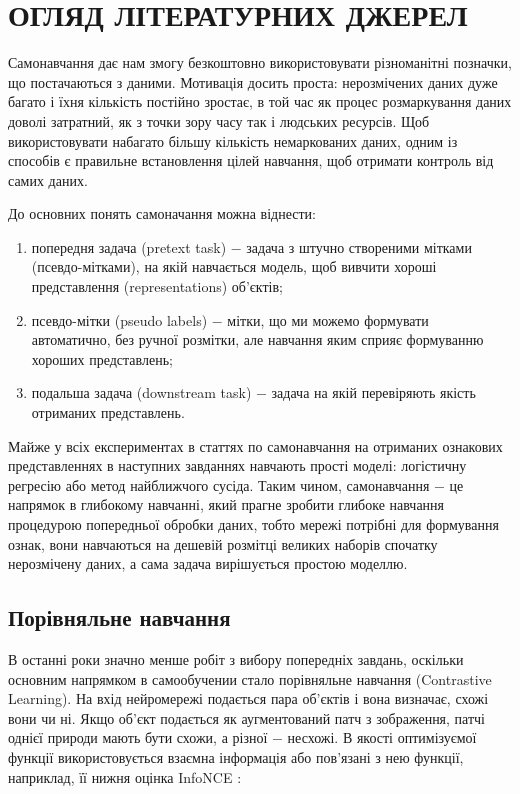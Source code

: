 \section{ОГЛЯД ЛІТЕРАТУРНИХ ДЖЕРЕЛ}
\label{sec:Theory}

Самонавчання дає нам змогу безкоштовно використовувати різноманітні позначки, що постачаються з даними. Мотивація досить проста: нерозмічених даних дуже багато і їхня кількість постійно зростає, в той час як процес розмаркування даних доволі затратний, як з точки зору часу так і людських ресурсів. Щоб використовувати набагато більшу кількість немаркованих даних, одним із способів є правильне встановлення цілей навчання, щоб отримати контроль від самих даних.

До основних понять самоначання можна віднести:

\begin{enumerate}
	\item попередня задача (pretext task) $-$ задача з штучно створеними мітками (псевдо-мітками), на якій навчається модель, щоб вивчити хороші представлення (representations) об'єктів;
	\item псевдо-мітки (pseudo labels) $-$ мітки, що ми можемо формувати автоматично, без ручної розмітки, але навчання яким сприяє формуванню хороших представлень;
	\item подальша задача (downstream task) $-$ задача на якій перевіряють якість отриманих представлень. 
\end{enumerate}
		
Майже у всіх експериментах в статтях по самонавчання на отриманих ознакових представленнях в наступних завданнях навчають прості моделі: логістичну регресію або метод найближчого сусіда. Таким чином, самонавчання $-$ це напрямок в глибокому навчанні, який прагне зробити глибоке навчання процедурою попередньої обробки даних, тобто мережі потрібні для формування ознак, вони навчаються на дешевій розмітці великих наборів спочатку нерозмічену даних, а сама задача вирішується простою моделлю.

\subsection{Порівняльне навчання}

В останні роки значно менше робіт з вибору попередніх завдань, оскільки основним напрямком в самообучении стало порівняльне навчання (Contrastive Learning). На вхід нейромережі подається пара об'єктів і вона визначає, схожі вони чи ні. Якщо об'єкт подається як аугментований патч з зображення, патчі однієї природи мають бути схожи, а різної $-$ несхожі. В якості оптимізуємої функції використовується взаємна інформація або пов'язані з нею функції, наприклад, її нижня оцінка InfoNCE :

